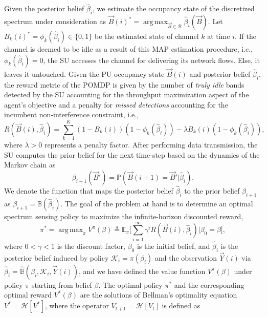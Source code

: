 \documentclass[10pt,twocolumn]{IEEEtran}
\DeclareMathOperator*{\argmax}{arg\,max}
\newcommand{\add}[1]{{\color{red}{#1}}}
\begin{document}
Given the posterior belief $\hat{\beta}_i$, we estimate the occupancy state of the discretized spectrum under consideration as $\vec{B}(i)^{*}{=}\argmax_{\vec{B} {\in} \mathcal{B}} \hat{\beta}_{i}(\vec{B})$. Let $B_{k}(i)^{*}{=}\phi_{k}(\hat{\beta}_{i}) {\in} \{0, 1\}$ be the estimated state of channel $k$ at time $i$. If the channel is deemed to be idle as a result of this MAP estimation procedure, i.e., $\phi_{k}(\hat{\beta}_{i}){=}0$, the SU accesses the channel for delivering its network flows. Else, it leaves it untouched. Given the PU occupancy state $\vec{B}(i)$ and posterior belief $\hat\beta_i$, the reward metric of the POMDP is given by the number of \emph{truly idle} bands detected by the SU\add{,} accounting for the throughput maximization aspect of the agent's objective\add{,} and a penalty for \emph{missed detections} accounting for the incumbent non-interference constraint, i.e.,
\begin{equation}
\nonumber
    R(\vec{B}(i), \hat{\beta}_i){=}\sum_{k=1}^{K} (1{-}B_k(i))(1{-}\phi_k(\hat{\beta}_{i})){-}\lambda B_k(i)(1 - \phi_k(\hat{\beta}_i)),
\end{equation}
where $\lambda{>}0$ represents a penalty factor. After performing data transmission, the SU computes the prior belief for the next time-step based on the dynamics of the Markov chain as
\begin{equation}\label{13}
    \beta_{i+1}(\vec{B}') = \mathbb{P}(\vec{B}(i+1) = \vec{B}'|\hat{\beta}_{i}).
\end{equation}
We denote the function that maps the posterior belief $\hat\beta_i$ to the prior belief $\beta_{i+1}$ as $\beta_{i+1}{=}{\mathbb B}(\hat\beta_i)$.
The goal of the problem at hand is to determine an optimal spectrum sensing policy to maximize the infinite-horizon discounted reward,
\begin{equation}\label{14}
    \pi^{*}{=}\argmax_{\pi} V^{\pi}(\beta) \triangleq \mathbb{E}_{\pi} \Big[\sum_{i=1}^{\infty} \gamma^{i} R(\vec{B}(i), \hat{\beta}_i)|\beta_0 {=}\beta\Big],
\end{equation}
where $0{<}\gamma{<}1$ is the discount factor, $\beta_0$ is the initial belief, and $\hat\beta_i$ is the posterior belief induced by policy $\mathcal K_i{=}\pi(\beta_i)$ and the observation $\vec{Y}(i)$ via $\hat\beta_i{=}\hat{\mathbb B}(\beta_i, \mathcal K_i, \vec{Y}(i))$, and we have defined the value function $V^{\pi}(\beta)$ under policy $\pi$ starting from belief $\beta$.
The optimal policy $\pi^*$ and the corresponding optimal reward $V^*(\beta)$ are the solutions of Bellman's optimality equation $V^*{=}\mathcal{H}[V^*]$, where the operator $V_{t+1}{=}\mathcal {H}[V_{t}]$ is defined as
\end{document}

